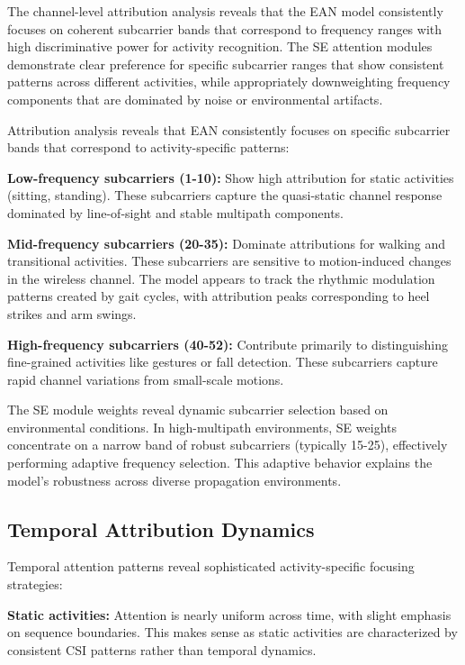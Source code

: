 \documentclass[lettersize,journal]{IEEEtran}
\begin{document}
The channel-level attribution analysis reveals that the EAN model consistently focuses on coherent subcarrier bands that correspond to frequency ranges with high discriminative power for activity recognition. The SE attention modules demonstrate clear preference for specific subcarrier ranges that show consistent patterns across different activities, while appropriately downweighting frequency components that are dominated by noise or environmental artifacts.

Attribution analysis reveals that EAN consistently focuses on specific subcarrier bands that correspond to activity-specific patterns:

\textbf{Low-frequency subcarriers (1-10):} Show high attribution for static activities (sitting, standing). These subcarriers capture the quasi-static channel response dominated by line-of-sight and stable multipath components.

\textbf{Mid-frequency subcarriers (20-35):} Dominate attributions for walking and transitional activities. These subcarriers are sensitive to motion-induced changes in the wireless channel. The model appears to track the rhythmic modulation patterns created by gait cycles, with attribution peaks corresponding to heel strikes and arm swings.

\textbf{High-frequency subcarriers (40-52):} Contribute primarily to distinguishing fine-grained activities like gestures or fall detection. These subcarriers capture rapid channel variations from small-scale motions.

The SE module weights reveal dynamic subcarrier selection based on environmental conditions. In high-multipath environments, SE weights concentrate on a narrow band of robust subcarriers (typically 15-25), effectively performing adaptive frequency selection. This adaptive behavior explains the model's robustness across diverse propagation environments.

\subsection{Temporal Attribution Dynamics}

Temporal attention patterns reveal sophisticated activity-specific focusing strategies:

\textbf{Static activities:} Attention is nearly uniform across time, with slight emphasis on sequence boundaries. This makes sense as static activities are characterized by consistent CSI patterns rather than temporal dynamics.
\end{document}
